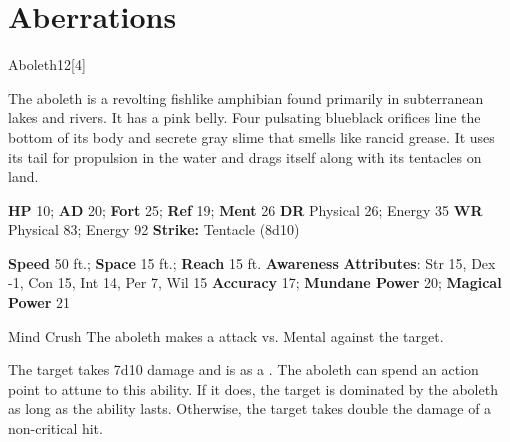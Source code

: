 
        \section{Aberrations}
      
  \begin{monsection}{Aboleth}{12}[4]
    \vspace{-1em}\vspace{-1em}
    \vspace{0em}

    
    The aboleth is a revolting fishlike amphibian found primarily in subterranean lakes and rivers.
    It has a pink belly.
    Four pulsating blueblack orifices line the bottom of its body and secrete gray slime that smells like rancid grease.
    It uses its tail for propulsion in the water and drags itself along with its tentacles on land.
  

    \begin{spellcontent}
      \begin{spelltargetinginfo}
        \pari \textbf{HP} 10;
          \textbf{AD} 20;
          \textbf{Fort} 25;
          \textbf{Ref} 19;
          \textbf{Ment} 26
        \pari \textbf{DR} Physical 26; Energy 35
        \pari \textbf{WR} Physical 83; Energy 92
        \pari \textbf{Strike:}
            Tentacle  (8d10)
      \end{spelltargetinginfo}
    \end{spellcontent}
    \begin{monsterfooter}
      \pari \textbf{Speed} 50 ft.;
        \textbf{Space} 15 ft.;
        \textbf{Reach} 15 ft.
      \pari \textbf{Awareness} 
      \pari \textbf{Attributes}:
        Str 15, Dex -1,
        Con 15, Int 14,
        Per 7, Wil 15
      \pari \textbf{Accuracy} 17;
        \textbf{Mundane Power} 20;
      \textbf{Magical Power} 21
    \end{monsterfooter}
  \end{monsection}
  \begin{freeability}{Mind Crush}
       The aboleth makes a  attack
        vs. Mental against the target.
    
    \hit The target takes 7d10  damage and is  as a .
    \crit 
          The aboleth can spend an action point to attune to this ability.
          If it does, the target is dominated by the aboleth as long as the ability lasts.
          Otherwise, the target takes double the damage of a non-critical hit.
    \end{freeability}
  

